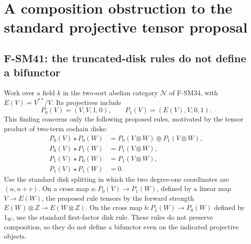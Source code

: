 \section{A composition obstruction to the standard projective tensor proposal}

\subsection{F-SM41: the truncated-disk rules do not define a bifunctor}

Work over a field \(k\) in the two-sort abelian category
\(\mathcal N\) of F-SM34, with
\(E(V)=V^{**}/V\).  Its projectives include
\[
 P_0(V)=(V,V,1,0),\qquad P_1(V)=(E(V),V,0,1).
\]
This finding concerns only the following proposed rules,
motivated by the tensor product of two-term cochain disks:
\[
 \begin{aligned}
 P_0(V)\star P_0(W)&=P_0(V\otimes W)\oplus P_1(V\otimes W),\\
 P_0(V)\star P_1(W)&=P_1(V\otimes W),\\
 P_1(V)\star P_0(W)&=P_1(V\otimes W),\\
 P_1(V)\star P_1(W)&=0.
 \end{aligned}                                                \tag{SM41.1}
\]
Use the standard disk splitting in which the two degree-one
coordinates are \((u,u+v)\).  On a cross map
\(a:P_0(V)\to P_1(W)\), defined by a linear map
\(V\to E(W)\), the proposed rule tensors by the forward
strength \(E(W)\otimes Z\to E(W\otimes Z)\).
On the cross map \(b:P_1(W)\to P_0(W)\) defined by
\(1_W\), use the standard first-factor disk rule.
These rules do not preserve composition, so they do not
define a bifunctor even on the indicated projective objects.

